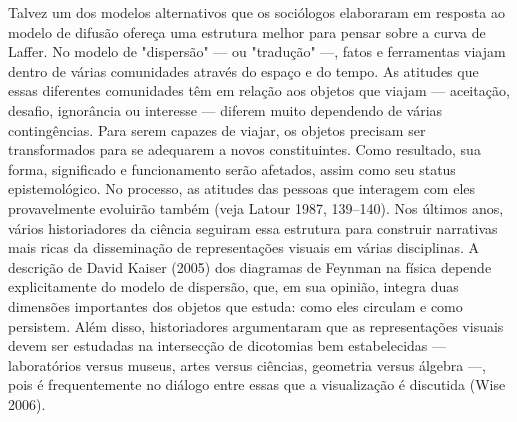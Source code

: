 \documentclass[a4paper,12pt]{article}[abntex2]
\begin{document}
Talvez um dos modelos alternativos que os sociólogos elaboraram em resposta ao modelo de difusão ofereça uma estrutura melhor para pensar sobre a curva de Laffer. No modelo de "dispersão" — ou "tradução" —, fatos e ferramentas viajam dentro de várias comunidades através do espaço e do tempo. As atitudes que essas diferentes comunidades têm em relação aos objetos que viajam — aceitação, desafio, ignorância ou interesse — diferem muito dependendo de várias contingências. Para serem capazes de viajar, os objetos precisam ser transformados para se adequarem a novos constituintes. Como resultado, sua forma, significado e funcionamento serão afetados, assim como seu status epistemológico. No processo, as atitudes das pessoas que interagem com eles provavelmente evoluirão também (veja Latour 1987, 139–140). Nos últimos anos, vários historiadores da ciência seguiram essa estrutura para construir narrativas mais ricas da disseminação de representações visuais em várias disciplinas. A descrição de David Kaiser (2005) dos diagramas de Feynman na física depende explicitamente do modelo de dispersão, que, em sua opinião, integra duas dimensões importantes dos objetos que estuda: como eles circulam e como persistem. Além disso, historiadores argumentaram que as representações visuais devem ser estudadas na intersecção de dicotomias bem estabelecidas — laboratórios versus museus, artes versus ciências, geometria versus álgebra —, pois é frequentemente no diálogo entre essas que a visualização é discutida (Wise 2006).
\end{document}
